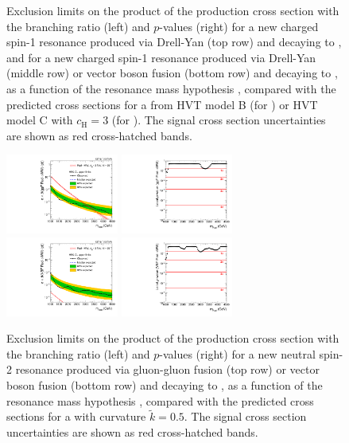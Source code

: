 \begin{figure}[htbp]
  \caption{
    Exclusion limits on the product of the production cross section with the branching ratio (left) and $p$-values (right) for a new charged spin-1 resonance produced via Drell-Yan (top row) and decaying to \WH, and for a new charged spin-1 resonance produced via Drell-Yan (middle row) or vector boson fusion (bottom row) and decaying to \WZ, as a function of the resonance mass hypothesis \MX, compared with the predicted cross sections for a \Wpr from HVT model B (for \DY) or HVT model C with $c_\mathrm{H}=3$ (for \VBF).
    The signal cross section uncertainties are shown as red cross-hatched bands.
  }
  \label{fig:limits_pvalue_spin1_char}
\end{figure}

\begin{figure}[htbp]
  \centering
  \includegraphics[width=0.33\textwidth]{fig/results/limits_RadToWW.pdf}
  \includegraphics[width=0.33\textwidth]{fig/results/pvalue_RadToWW.pdf}\\
  \includegraphics[width=0.33\textwidth]{fig/results/limits_VBFRadToWW.pdf}
  \includegraphics[width=0.33\textwidth]{fig/results/pvalue_VBFRadToWW.pdf}\\
  \caption{
    Exclusion limits on the product of the production cross section with the branching ratio (left) and $p$-values (right) for a new neutral spin-2 resonance produced via gluon-gluon fusion (top row) or vector boson fusion (bottom row) and decaying to \WW, as a function of the resonance mass hypothesis \MX, compared with the predicted cross sections for a \GBulk with curvature $\tilde{k}=0.5$.
    The signal cross section uncertainties are shown as red cross-hatched bands.
  }
  \label{fig:limits_pvalue_spin2}
\end{figure}
